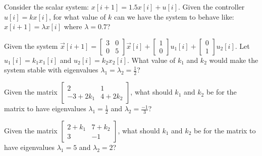 
\begin{enumerate}

\qitem Consider the scalar system: $x[i+1] = 1.5 x[i] + u[i]$. Given the controller $u[i] = k x[i]$, for what value of $k$ can we have the system to behave like:$x[i+1] = \lambda x[i]$ where $\lambda = 0.7$?



\qitem Given the system $\vec{x}[i+1]  = \left [ \begin{array}{cc} 3&0\\0&5 \end{array}\right] \vec{x}[i] + \left[\begin{array}{c}1\\0 \end{array}\right] u_1[i]+ \left[\begin{array}{c}0\\1 \end{array}\right] u_2[i]$.
Let $u_1[i] = k_1 x_1[i]$ and $u_2[i] = k_2 x_2[i]$. What value of $k_1$ and $k_2$ would make the system stable with eigenvalues $\lambda_1 = \lambda_2 = \frac{1}{2}$?











\qitem Given the matrix $\begin{bmatrix}
2  & 1 \\
-3 + 2k_1 & 4+2k_2
\end{bmatrix}$,
what should $k_1$ and $k_2$ be for the matrix to have eigenvalues $\lambda_1=\frac{1}{2}$ and $\lambda_2=\frac{-1}{3}$?







\qitem Given the matrix $\begin{bmatrix}
2+ k_1  & 7 +k_2 \\
3 & -1
\end{bmatrix}$,
what should $k_1$ and $k_2$ be for the matrix to have eigenvalues $\lambda_1=5$ and $\lambda_2=2$?









\end{enumerate}
